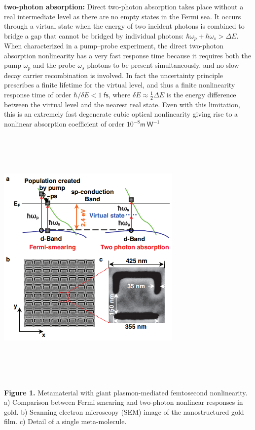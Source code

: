 \documentclass[]{article}
\begin{document}
\textbf{two-photon absorption:} Direct two-photon absorption takes place
without a real intermediate level as there are no empty states in the
Fermi sea. It occurs through a virtual state when the energy of two
incident photons is combined to bridge a gap that cannot be bridged by
individual photons: $ \hbar \omega_p + \hbar \omega_s > \Delta E$. When
characterized in a pump--probe experiment, the direct two-photon
absorption nonlinearity has a very fast response time because it
requires both the pump \(\omega_p\) and the probe \(\omega_s\) photons
to be present simultaneously, and no slow decay carrier recombination is
involved. In fact the uncertainty principle prescribes a finite lifetime
for the virtual level, and thus a finite nonlinearity response time of
order \( \hbar/\delta E < 1\;\mathsf{fs}\), where
\( \delta E \approx \frac{1}{2} \Delta E\) is the energy difference
between the virtual level and the nearest real state. Even with this
limitation, this is an extremely fast degenerate cubic optical
nonlinearity giving rise to a nonlinear absorption coefficient of order
\( 10^{-8} \mathsf m\,\mathsf W^{-1}\)

\centerline{\includegraphics[width=9cm,height=13cm]{image/001_01.png}}
\textbf{Figure 1.} Metamaterial with giant plasmon-mediated femtosecond
nonlinearity. a) Comparison between Fermi smearing and two-photon
nonlinear responses in gold. b) Scanning electron microscopy (SEM) image
of the nanostructured gold film. c) Detail of a single meta-molecule.
\end{document}
